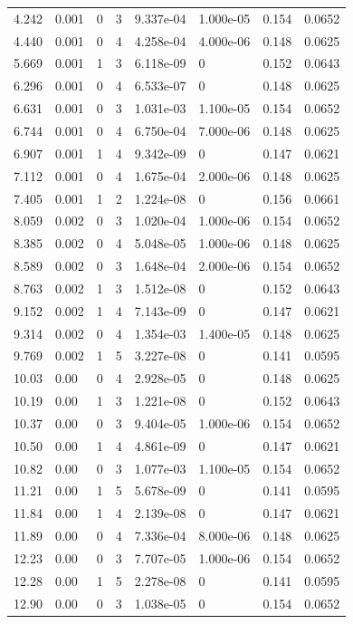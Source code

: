 \documentclass[preview]{standalone}
\begin{document}
{{\begin{tabular}{L{1.2cm}C{1.2cm} C{0.3cm}C{0.5cm} C{1.4cm}C{1.4cm} C{1.4cm}C{1.4cm}}
  4.242  &  0.001  & 0     &  3 &  9.337e-04  & 1.000e-05  & 0.154 &  0.0652   \\ 
  4.440  &  0.001  & 0     &  4 &  4.258e-04  & 4.000e-06  & 0.148 &  0.0625   \\ 
  5.669  &  0.001  & 1     &  3 &  6.118e-09  & 0  & 0.152 &  0.0643   \\ 
  6.296  &  0.001  & 0     &  4 &  6.533e-07  & 0  & 0.148 &  0.0625   \\ 
  6.631  &  0.001  & 0     &  3 &  1.031e-03  & 1.100e-05  & 0.154 &  0.0652   \\ 
  6.744  &  0.001  & 0     &  4 &  6.750e-04  & 7.000e-06  & 0.148 &  0.0625   \\ 
  6.907  &  0.001  & 1     &  4 &  9.342e-09  & 0  & 0.147 &  0.0621   \\ 
  7.112  &  0.001  & 0     &  4 &  1.675e-04  & 2.000e-06  & 0.148 &  0.0625   \\ 
  7.405  &  0.001  & 1     &  2 &  1.224e-08  & 0  & 0.156 &  0.0661   \\ 
  8.059  &  0.002  & 0     &  3 &  1.020e-04  & 1.000e-06  & 0.154 &  0.0652   \\ 
  8.385  &  0.002  & 0     &  4 &  5.048e-05  & 1.000e-06  & 0.148 &  0.0625   \\ 
  8.589  &  0.002  & 0     &  3 &  1.648e-04  & 2.000e-06  & 0.154 &  0.0652   \\ 
  8.763  &  0.002  & 1     &  3 &  1.512e-08  & 0  & 0.152 &  0.0643   \\ 
  9.152  &  0.002  & 1     &  4 &  7.143e-09  & 0  & 0.147 &  0.0621   \\ 
  9.314  &  0.002  & 0     &  4 &  1.354e-03  & 1.400e-05  & 0.148 &  0.0625   \\ 
  9.769  &  0.002  & 1     &  5 &  3.227e-08  & 0  & 0.141 &  0.0595   \\ 
  10.03  &  0.00  & 0     &  4 &  2.928e-05  & 0  & 0.148 &  0.0625   \\ 
  10.19  &  0.00  & 1     &  3 &  1.221e-08  & 0  & 0.152 &  0.0643   \\ 
  10.37  &  0.00  & 0     &  3 &  9.404e-05  & 1.000e-06  & 0.154 &  0.0652   \\ 
  10.50  &  0.00  & 1     &  4 &  4.861e-09  & 0  & 0.147 &  0.0621   \\ 
  10.82  &  0.00  & 0     &  3 &  1.077e-03  & 1.100e-05  & 0.154 &  0.0652   \\ 
  11.21  &  0.00  & 1     &  5 &  5.678e-09  & 0  & 0.141 &  0.0595   \\ 
  11.84  &  0.00  & 1     &  4 &  2.139e-08  & 0  & 0.147 &  0.0621   \\ 
  11.89  &  0.00  & 0     &  4 &  7.336e-04  & 8.000e-06  & 0.148 &  0.0625   \\ 
  12.23  &  0.00  & 0     &  3 &  7.707e-05  & 1.000e-06  & 0.154 &  0.0652   \\ 
  12.28  &  0.00  & 1     &  5 &  2.278e-08  & 0  & 0.141 &  0.0595   \\ 
  12.90  &  0.00  & 0     &  3 &  1.038e-05  & 0  & 0.154 &  0.0652   \\ 
\hline 
\end{tabular} 

}}
\end{document}
